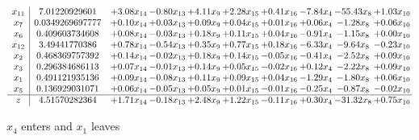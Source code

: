 \documentclass[9pt]{article}
\begin{document}
 \[\begin{array}{c| c c@{\hskip 2pt} c@{\hskip 2pt} c@{\hskip 2pt} c@{\hskip 2pt} c@{\hskip 2pt} c@{\hskip 2pt} c@{\hskip 2pt} c@{\hskip 2pt} }
 x_{11}   &  7.01220929601 & +  3.08 x_{14} & -0.80 x_{13} & +  4.11 x_{9} & +  2.28 x_{15} & +  0.41 x_{16} & -7.84 x_{4} & -55.43 x_{8} & +  1.03 x_{10}\\
 x_{7}   &  0.0349269697777 & +  0.10 x_{14} & +  0.03 x_{13} & +  0.09 x_{9} & +  0.04 x_{15} & +  0.01 x_{16} & +  0.06 x_{4} & -1.28 x_{8} & +  0.06 x_{10}\\
 x_{6}   &  0.409603734608 & +  0.08 x_{14} & -0.03 x_{13} & +  0.18 x_{9} & +  0.11 x_{15} & +  0.04 x_{16} & -0.91 x_{4} & -1.15 x_{8} & +  0.00 x_{10}\\
 x_{12}   &  3.49441770386 & +  0.78 x_{14} & -0.54 x_{13} & +  0.35 x_{9} & +  0.77 x_{15} & +  0.18 x_{16} & -6.33 x_{4} & -9.64 x_{8} & -0.23 x_{10}\\
 x_{2}   &  0.468369757392 & +  0.14 x_{14} & -0.02 x_{13} & +  0.18 x_{9} & +  0.14 x_{15} & -0.05 x_{16} & -0.41 x_{4} & -2.52 x_{8} & +  0.09 x_{10}\\
 x_{3}   &  0.296384686113 & +  0.07 x_{14} & -0.01 x_{13} & +  0.14 x_{9} & +  0.05 x_{15} & -0.02 x_{16} & +  0.12 x_{4} & -2.22 x_{8} & +  0.09 x_{10}\\
 x_{1}   &  0.491121935136 & +  0.09 x_{14} & -0.08 x_{13} & +  0.11 x_{9} & +  0.09 x_{15} & +  0.04 x_{16} & -1.29 x_{4} & -1.80 x_{8} & +  0.06 x_{10}\\
 x_{5}   &  0.136929031071 & +  0.06 x_{14} & -0.05 x_{13} & +  0.05 x_{9} & +  0.01 x_{15} & -0.01 x_{16} & -0.25 x_{4} & -0.87 x_{8} & -0.02 x_{10}\\
\hline
z    &  4.51570282364 & +  1.71 x_{14} & -0.18 x_{13} & +  2.48 x_{9} & +  1.22 x_{15} & -0.11 x_{16} & +  0.30 x_{4} & -31.32 x_{8} & +  0.75 x_{10}\\
\end{array}\]


 $ x_{4} $ enters and $ x_{1} $ leaves 
\end{document}
